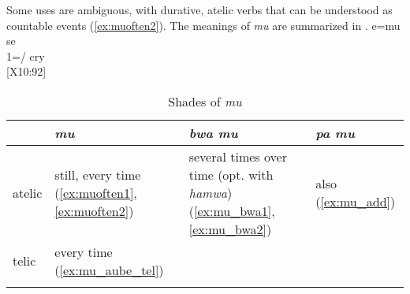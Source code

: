 Some uses are ambiguous, with durative, atelic verbs that can be understood as countable events (\ref{ex:muoften2}). The meanings of \textit{mu} are summarized in .
 \ea \label{ex:muoften2}
\gll e=mu se\\
 1=/ cry\\
\glt {} {[X10:92]}
\z


\begin{table}
	\centering
	\caption{Shades of \textit{mu}}
	\begin{tabularx}{\textwidth}{llQl}
		\lsptoprule
		& \textit{mu} & \textit{bwa mu} & \textit{pa mu} \\
		\midrule
		atelic  &  still, every time (\ref{ex:muoften1}, \ref{ex:muoften2}) & several times over time (opt. with \textit{hamwa}) (\ref{ex:mu_bwa1}, \ref{ex:mu_bwa2})     &  also (\ref{ex:mu_add}) \\
		telic  & every time (\ref{ex:mu_aube_tel})&     \\
\lspbottomrule
	\end{tabularx}
	\label{tab:mu}
\end{table}


%	




%
%
%
%
%

